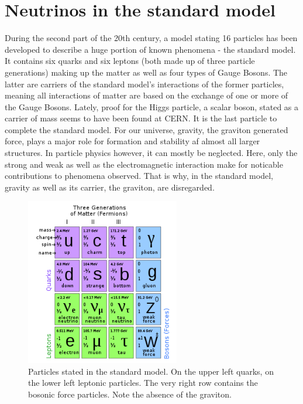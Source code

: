     \section{Neutrinos in the standard model}
    \label{ch:Introduction:sec:Neutrinos in the standard model}
    During the second part of the 20th century, a model stating 16 particles has been developed to describe a huge portion of known phenomena - the standard model. It contains six quarks and six leptons (both made up of three particle generations) making up the matter as well as four types of Gauge Bosons. The latter are carriers of the standard model's interactions of the former particles, meaning all interactions of matter are based on the exchange of one or more of the Gauge Bosons.
    Lately, proof for the Higgs particle, a scalar boson, stated as a carrier of mass seems to have been found at CERN. It is the last particle to complete the standard model.
    For our universe, gravity, the graviton generated force, plays a major role for formation and stability af almost all larger structures. In particle physics however, it can mostly be neglected. Here, only the strong and weak as well as the electromagnetic interaction make for noticable contributions to phenomena observed. That is why, in the standard model, gravity as well as its carrier, the graviton, are disregarded.
    \begin{figure}
    	\centering
    	\includegraphics[width = 0.6\textwidth]{graphics/standardModel/particles.png}
    	\caption[standard model particles]{Particles stated in the standard model. On the upper left quarks, on the lower left leptonic particles. The very right row contains the bosonic force particles. Note the absence of the graviton.\cite{particlesSM}}
    	\label{fig:standardModel:particles}
    \end{figure}
	
